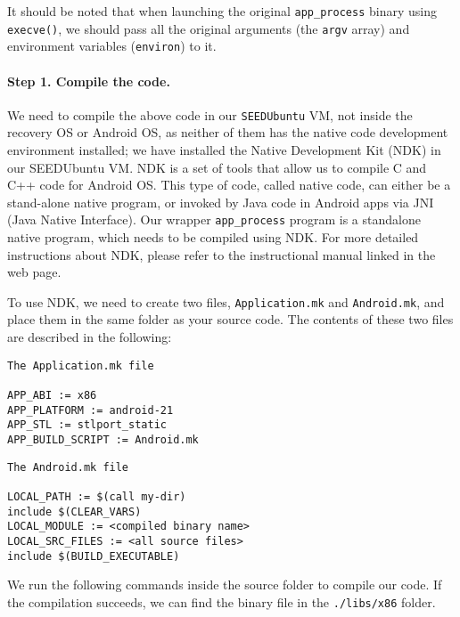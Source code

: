 It should be noted that when launching the original \texttt{app\_process} binary using 
\texttt{execve()}, we should pass all the original arguments (the \texttt{argv} array) 
and environment variables (\texttt{environ}) to it. 


\paragraph{Step 1. Compile the code.}
We need to compile the above code in our \texttt{SEEDUbuntu} VM, not inside the recovery OS or Android
OS, as neither of them has the native code development environment installed; we have installed the 
Native Development Kit (NDK) in our SEEDUbuntu VM. 
NDK is a set of tools that allow us to compile C and C++ code for Android OS. This type of
code, called native code, can either be a stand-alone native program, or invoked by
Java code in Android apps via JNI (Java Native Interface). 
Our wrapper \texttt{app\_process} program is a standalone native program, which needs to
be compiled using NDK. For more detailed instructions about NDK, please refer to the
instructional manual linked in the web page. 



To use NDK, we need to create two files, \texttt{Application.mk} and \texttt{Android.mk},
and place them in the same folder as your source code. The
contents of these two files are described in the following:



\begin{lstlisting}[frame=single, caption={}, label=label]
The Application.mk file

APP_ABI := x86
APP_PLATFORM := android-21
APP_STL := stlport_static
APP_BUILD_SCRIPT := Android.mk
\end{lstlisting}


\begin{lstlisting}[frame=single, caption={}, label=label]
The Android.mk file

LOCAL_PATH := $(call my-dir)
include $(CLEAR_VARS)
LOCAL_MODULE := <compiled binary name>
LOCAL_SRC_FILES := <all source files>
include $(BUILD_EXECUTABLE)
\end{lstlisting}
 
We run the following commands inside the source folder to compile our code.
If the compilation succeeds, we can find the binary file in the 
\texttt{./libs/x86} folder.

